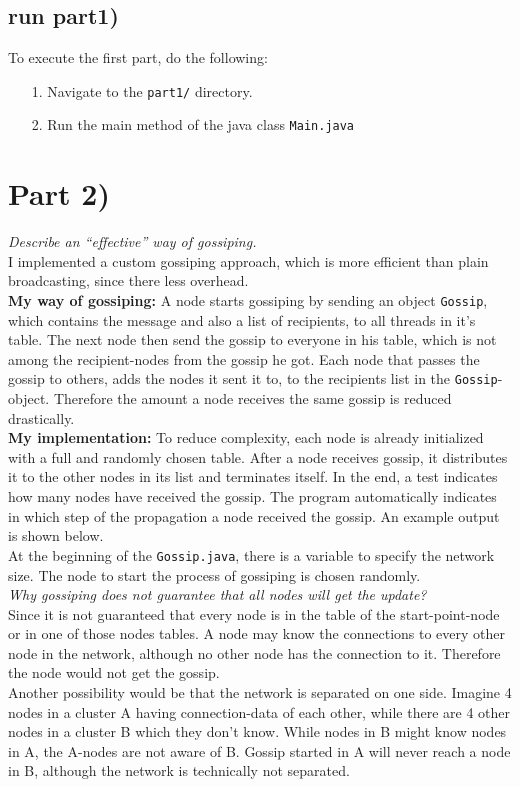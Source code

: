 \documentclass{article}
\begin{document}
    \subsection*{run part1)}
    
      To execute the first part, do the following:
      \begin{itemize}
    	\item[1.] Navigate to the \texttt{part1/} directory.
    	\item[2.] Run the main method of the java class \texttt{Main.java}
      \end{itemize} 
      
  \section*{Part 2)}
  
    \textit{Describe an “effective” way of gossiping.}\\
    I implemented a custom gossiping approach, which is more efficient than plain broadcasting, since there less overhead.\\
    \textbf{My way of gossiping:} A node starts gossiping by sending an object \texttt{Gossip}, which contains the message and also a list of recipients, to all threads in it's table. The next node then send the gossip to everyone in his table, which is not among the recipient-nodes from the gossip he got. Each node that passes the gossip to others, adds the nodes it sent it to, to the recipients list in the \texttt{Gossip}-object. Therefore the amount a node receives the same gossip is reduced drastically.\\
    \textbf{My implementation:} To reduce complexity, each node is already initialized with a full and randomly chosen table. After a node receives gossip, it distributes it to the other nodes in its list and terminates itself. In the end, a test indicates how many nodes have received the gossip. The program automatically indicates in which step of the propagation a node received the gossip. An example output is shown below.\\
    At the beginning of the \texttt{Gossip.java}, there is a variable to specify the network size. The node to start the process of gossiping is chosen randomly.\\
    \newline
    \textit{Why gossiping does not guarantee that all nodes will get the update?}\\
    Since it is not guaranteed that every node is in the table of the start-point-node or in one of those nodes tables. A node may know the connections to every other node in the network, although no other node has the connection to it. Therefore the node would not get the gossip.\\
    Another possibility would be that the network is separated on one side. Imagine 4 nodes in a cluster A having connection-data of each other, while there are 4 other nodes in a cluster B which they don't know. While nodes in B might know nodes in A, the A-nodes are not aware of B. Gossip started in A will never reach a node in B, although the network is technically not separated.\\
    
\end{document}
